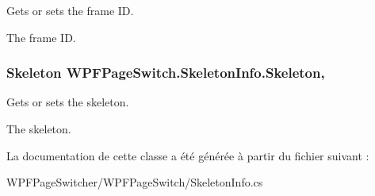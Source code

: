 Gets or sets the frame I\+D. 

The frame I\+D. \hypertarget{class_w_p_f_page_switch_1_1_skeleton_info_a75b7e8daeca9c2bb1d9782edb62522dc}{
\subsubsection[{Skeleton}]{\setlength{\rightskip}{0pt plus 5cm}Skeleton W\+P\+F\+Page\+Switch.\+Skeleton\+Info.\+Skeleton\hspace{0.3cm}{\ttfamily [get]}, {\ttfamily [set]}}}\label{class_w_p_f_page_switch_1_1_skeleton_info_a75b7e8daeca9c2bb1d9782edb62522dc}


Gets or sets the skeleton. 

The skeleton. 

La documentation de cette classe a été générée à partir du fichier suivant \+:\begin{DoxyCompactItemize}
\item 
W\+P\+F\+Page\+Switcher/\+W\+P\+F\+Page\+Switch/Skeleton\+Info.\+cs\end{DoxyCompactItemize}
